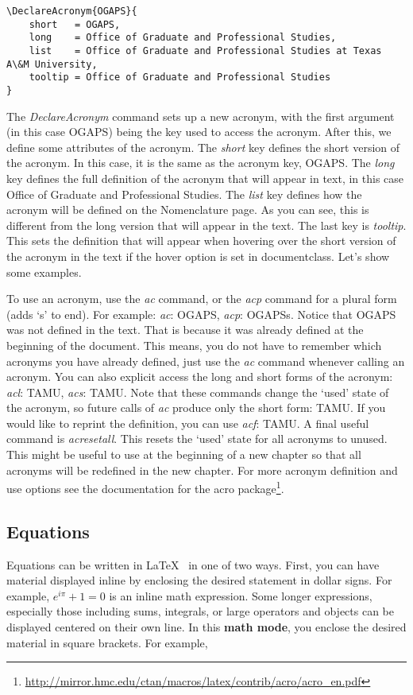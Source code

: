 {\small \begin{verbatim}
\DeclareAcronym{OGAPS}{
	short   = OGAPS,
	long    = Office of Graduate and Professional Studies,
	list    = Office of Graduate and Professional Studies at Texas A\&M University,
	tooltip = Office of Graduate and Professional Studies
}
\end{verbatim}}

The {\it DeclareAcronym} command sets up a new acronym, with the first argument (in this case OGAPS) being the key used to access the acronym.
After this, we define some attributes of the acronym.
The {\it short} key defines the short version of the acronym.
In this case, it is the same as the acronym key, OGAPS.
The {\it long} key defines the full definition of the acronym that will appear in text, in this case Office of Graduate and Professional Studies.
The {\it list} key defines how the acronym will be defined on the Nomenclature page.
As you can see, this is different from the long version that will appear in the text.
The last key is {\it tooltip}.
This sets the definition that will appear when hovering over the short version of the acronym in the text if the hover option is set in documentclass.
Let's show some examples.

To use an acronym, use the {\it ac} command, or the {\it acp} command for a plural form (adds `s' to end).
For example: {\it ac}: \ac{OGAPS}, {\it acp}: \acp{OGAPS}.
Notice that \ac{OGAPS} was not defined in the text.
That is because it was already defined at the beginning of the document.
This means, you do not have to remember which acronyms you have already defined, just use the {\it ac} command whenever calling an acronym.
You can also explicit access the long and short forms of the acronym: {\it acl}: \acl{TAMU}, {\it acs}: \acs{TAMU}.
Note that these commands change the `used' state of the acronym, so future calls of {\it ac} produce only the short form: \ac{TAMU}.
If you would like to reprint the definition, you can use {\it acf}: \acf{TAMU}.
A final useful command is {\it acresetall}.
This resets the `used' state for all acronyms to unused.
This might be useful to use at the beginning of a new chapter so that all acronyms will be redefined in the new chapter.
For more acronym definition and use options see the documentation for the acro package\footnote{\url{http://mirror.hmc.edu/ctan/macros/latex/contrib/acro/acro_en.pdf}}.

\subsection{Equations}
Equations can be written in \LaTeX ~ in one of two ways. First, you can have material displayed inline by enclosing the desired statement in dollar signs. For example, $e^{i\pi}+1=0$ is an inline math expression. Some longer expressions, especially those including sums, integrals, or large operators and objects can be displayed centered on their own line. In this \textbf{math mode}, you enclose the desired material in square brackets. For example,


